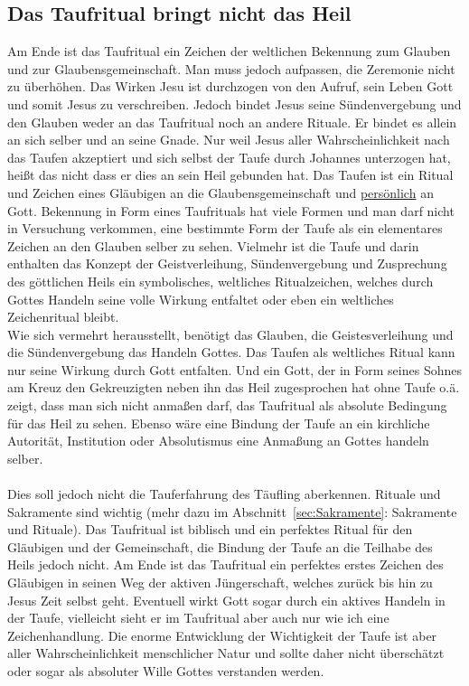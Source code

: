 \subsection{Das Taufritual bringt nicht das Heil}
Am Ende ist das Taufritual ein Zeichen der weltlichen Bekennung zum Glauben und zur Glaubensgemeinschaft. Man muss jedoch aufpassen, die Zeremonie nicht zu überhöhen.
Das Wirken Jesu ist durchzogen von den Aufruf, sein Leben Gott und somit Jesus zu verschreiben. Jedoch bindet Jesus seine Sündenvergebung und den Glauben
weder an das Taufritual noch an andere Rituale. Er bindet es allein an sich selber und an seine Gnade. Nur weil Jesus aller Wahrscheinlichkeit nach das Taufen
akzeptiert und sich selbst der Taufe durch Johannes unterzogen hat, heißt das nicht dass er dies an sein Heil gebunden hat.
Das Taufen ist ein Ritual und Zeichen eines Gläubigen an die Glaubensgemeinschaft und \underline{persönlich} an Gott. Bekennung in Form eines Taufrituals hat viele Formen
und man darf nicht in Versuchung verkommen, eine bestimmte Form der Taufe als ein elementares Zeichen an den Glauben selber zu sehen. Vielmehr ist die Taufe und darin enthalten das
Konzept der Geistverleihung, Sündenvergebung und Zusprechung des göttlichen Heils ein symbolisches, weltliches Ritualzeichen, welches durch Gottes Handeln seine volle
Wirkung entfaltet oder eben ein weltliches Zeichenritual bleibt.
\\
Wie sich vermehrt herausstellt, benötigt das Glauben, die Geistesverleihung und die Sündenvergebung das Handeln Gottes. Das Taufen als weltliches Ritual kann
nur seine Wirkung durch Gott entfalten. Und ein Gott, der in Form seines Sohnes am Kreuz den Gekreuzigten neben ihn das Heil zugesprochen hat ohne Taufe o.ä.
zeigt, dass man sich nicht anmaßen darf, das Taufritual als absolute Bedingung für das Heil zu sehen. Ebenso wäre eine Bindung der Taufe an ein kirchliche Autorität,
Institution oder Absolutismus eine Anmaßung an Gottes handeln selber.
\\~\\
Dies soll jedoch nicht die Tauferfahrung des Täufling aberkennen. Rituale und Sakramente sind wichtig (mehr dazu im Abschnitt\ \ref{sec:Sakramente}: Sakramente und Rituale).
Das Taufritual ist biblisch und ein perfektes Ritual für den Gläubigen und der Gemeinschaft, die Bindung der Taufe an die Teilhabe des Heils jedoch nicht.
Am Ende ist das Taufritual ein perfektes erstes Zeichen des Gläubigen in seinen Weg der aktiven Jüngerschaft, welches zurück bis hin zu Jesus Zeit selbst geht. Eventuell wirkt Gott sogar durch ein aktives Handeln in der Taufe, vielleicht sieht er im Taufritual aber auch nur wie ich eine Zeichenhandlung.
Die enorme Entwicklung der Wichtigkeit der Taufe ist aber aller Wahrscheinlichkeit menschlicher Natur und sollte daher nicht überschätzt oder sogar als absoluter Wille Gottes verstanden werden.

